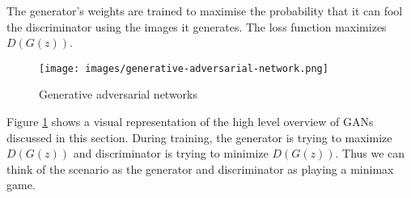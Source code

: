 \begin{onehalfspace}
    The generator's weights are trained to maximise the probability that it can 
    fool the discriminator using the images it generates. The loss function 
    maximizes \(D(G(z))\).

    \begin{figure}[h]
        \centering
        \texttt{[image: images/generative-adversarial-network.png]}
        \caption{Generative adversarial networks \cite{gan_image}}
        \label{fig:gans}
    \end{figure} 

    Figure \ref{fig:gans} shows a visual representation of the high level 
    overview of GANs discussed in this section.
    During training, the generator is trying to maximize \(D(G(z))\) and 
    discriminator is trying to minimize \(D(G(z))\).  Thus we can think of the 
    scenario as the generator and discriminator as playing a minimax game.


\end{onehalfspace}

